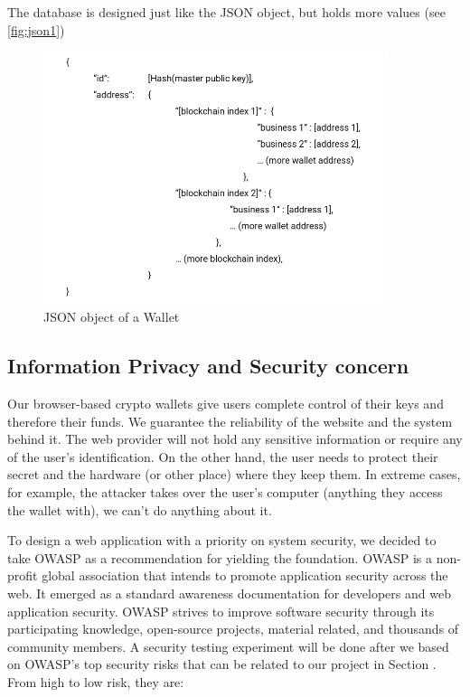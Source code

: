 The database is designed just like the JSON object, but holds more values (see \autoref{fig:json1})

\begin{figure}[!ht]
    \centering
    \includegraphics[width=0.9\textwidth]{images/json1.png}
    \caption[General JSON object of a Wallet]{JSON object of a Wallet}
    \label{fig:json1}
\end{figure}


\subsection{Information Privacy and Security concern}

Our browser-based crypto wallets give users complete control of their keys and therefore their funds. We guarantee the reliability of the website and the system behind it. The web provider will not hold any sensitive information or require any of the user's identification. On the other hand, the user needs to protect their secret and the hardware (or other place) where they keep them. In extreme cases, for example, the attacker takes over the user's computer (anything they access the wallet with), we can't do anything about it.

To design a web application with a priority on system security, we decided to take OWASP as a recommendation for yielding the foundation. OWASP is a non-profit global association that intends to promote application security across the web. It emerged as a standard awareness documentation for developers and web application security. OWASP strives to improve software security through its participating knowledge, open-source projects, material related, and thousands of community members. A security testing experiment will be done after we based on OWASP's top security risks that can be related to our project in Section . From high to low risk, they are:

